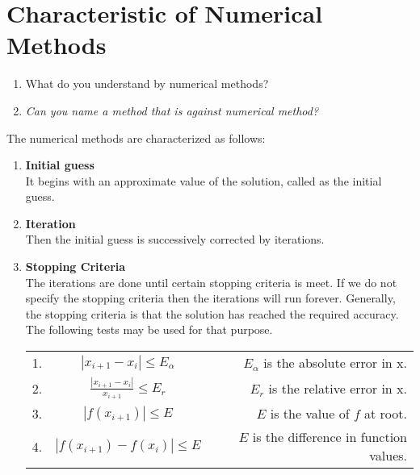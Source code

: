 \documentclass[aima203_lecturenotes_ku.tex]{subfiles}
\begin{document}
\section{Characteristic of Numerical Methods}
\begin{enumerate}
\item What do you understand by numerical methods?
\item \textit{Can you name a method that is against numerical method?}
\end{enumerate}

The numerical methods are characterized as follows:
\begin{enumerate}
\item \textbf{Initial guess} \\[1mm]
  It begins with an approximate value of the solution, called as the initial guess.
\item \textbf{Iteration} \\[1mm]
  Then the initial guess is successively corrected by iterations.
\item \textbf{Stopping Criteria} \\[1mm]
  The iterations are done until certain stopping criteria is meet. If we do not specify the stopping criteria then the iterations will run forever. Generally, the stopping criteria is that the solution has reached the required accuracy. The following tests may be used for that purpose.
  \begin{table}[h]
    \centering
    \begin{tabular}{|c|c|r|}
      \hline
      1. &$|x_{i+1} -x_i| \leq E_{\alpha} $ & $E_{\alpha}$ is the absolute error in x. \\[3mm]
      2. &$\displaystyle \frac{|x_{i+1} -x_i|}{x_{i+1}} \leq E_r $ & $E_r$ is the relative error in x. \\[5mm]
      3. &$|f(x_{i+1})| \leq E $ & $E$ is the value of $f$ at root. \\[3mm]
      4. &$|f(x_{i+1})-f(x_i)| \leq E $ \hspace{10mm}& $E$ is the difference in function values. \\[2mm]
      \hline
    \end{tabular}
  \end{table}
\end{enumerate}
\end{document}

